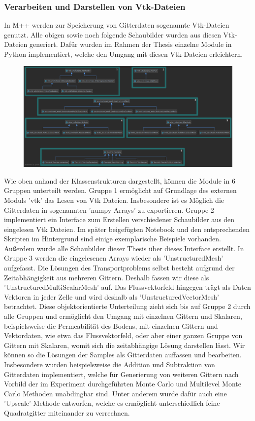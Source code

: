 \subsubsection{Verarbeiten und Darstellen von Vtk-Dateien}
In M++ werden zur Speicherung von Gitterdaten sogenannte Vtk-Dateien genutzt. Alle obigen sowie noch folgende Schaubilder wurden aus diesen Vtk-Dateien generiert. Dafür wurden im Rahmen der Thesis einzelne Module in Python implementiert, welche den Umgang mit diesen Vtk-Dateien erleichtern. 
\begin{figure}[H]
	\centering
	\includegraphics[width=\textwidth]{plots/klassenuml2.png} 
\end{figure}
Wie oben anhand der Klassenstrukturen dargestellt, können die Module in 6 Gruppen unterteilt werden. Gruppe 1 ermöglicht auf Grundlage des externen Moduls 'vtk' \cite{sitevtk} das Lesen von Vtk Dateien. Insbesondere ist es Möglich die Gitterdaten in sogenannten 'numpy-Arrays' zu exportieren. 
Gruppe 2 implementiert ein Interface zum Erstellen verschiedener Schaubilder aus den eingelesen Vtk Dateien. Im später beigefügten Notebook und den entsprechenden Skripten im Hintergrund sind einige exemplarische Beispiele vorhanden. Außerdem wurde alle Schaubilder dieser Thesis über dieses Interface erstellt.
In Gruppe 3 werden die eingelesenen Arrays wieder als 'UnstructuredMesh' aufgefasst. Die Lösungen des Transportproblems selbst besteht aufgrund der Zeitabhängigkeit aus mehreren Gittern. Deshalb fassen wir diese als 'UnstructuredMultiScalarMesh' auf. Das Flussvektorfeld hingegen trägt als Daten Vektoren in jeder Zelle und wird deshalb als 'UnstructuredVectorMesh' betrachtet. Diese objektorientierte Unterteilung zieht sich bis auf Gruppe 2 durch alle Gruppen und ermöglicht den Umgang mit einzelnen Gittern und Skalaren, beispielsweise die Permeabilität des Bodens, mit einzelnen Gittern und Vektordaten, wie etwa das Flussvektorfeld, oder aber einer ganzen Gruppe von Gittern mit Skalaren, womit sich die zeitabhängige Lösung darstellen lässt. Wir können so die Lösungen der Samples als Gitterdaten auffassen und bearbeiten. Insbesondere wurden beispielsweise die Addition und Subtraktion von Gitterdaten implementiert, welche für Generierung von weiteren Gittern nach Vorbild der im Experiment durchgeführten Monte Carlo und Multilevel Monte Carlo Methoden unabdingbar sind. Unter anderem wurde dafür auch eine 'Upscale'-Methode entworfen, welche es ermöglicht unterschiedlich feine Quadratgitter miteinander zu verrechnen.
